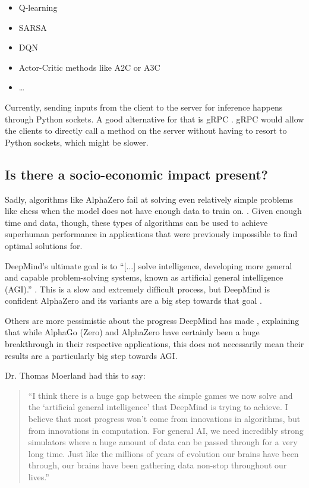 \documentclass{article}
\begin{document}
\begin{itemize}
    \item Q-learning
    \item SARSA
    \item DQN
    \item Actor-Critic methods like A2C or A3C
    \item \dots
\end{itemize}

Currently, sending inputs from the client to the server for inference
happens through Python sockets. A good alternative for that is gRPC \cite{IntroductionGRPC}. 
gRPC would allow the clients to directly call a method on the server without having to 
resort to Python sockets, which might be slower. 

\subsection{Is there a socio-economic impact present?}

Sadly, algorithms like AlphaZero fail at solving even relatively simple problems like chess when the model 
does not have enough data to train on.  \cite{ThomasMoerlandPostdoc}. 
Given enough time and data, though, these types of algorithms can be used to achieve superhuman
performance in applications that were previously impossible to find optimal solutions for.

DeepMind's ultimate goal is to ``[...] solve intelligence, developing more general and capable 
problem-solving systems, known as artificial general intelligence (AGI).'' \cite{DeepMind}.
This is a slow and extremely difficult process, but DeepMind is confident AlphaZero and 
its variants are a big step towards that goal \cite{AlphaZeroSheddingNew}.

Others are more pessimistic about the progress DeepMind has made \cite{moerlandEmailExchangeTuur22, dukezhouAnswerAlphaZeroExample2018},
explaining that while AlphaGo (Zero) and AlphaZero have certainly been a huge breakthrough in their respective applications, 
this does not necessarily mean their results are a particularly big step towards AGI. 

Dr. Thomas Moerland had this to say:

\begin{quotation}
    ``I think there is a huge gap between the simple games we now solve and the 
    `artificial general intelligence' that DeepMind is trying to achieve.
    I believe that most progress won't come from innovations in algorithms, but from innovations in computation.
    For general AI, we need incredibly strong simulators where a huge amount of data
    can be passed through for a very long time. 
    Just like the millions of years of evolution our brains have been through, our brains
    have been gathering data non-stop throughout our lives.'' \cite{moerlandEmailExchangeTuur22}
\end{quotation}
\end{document}
